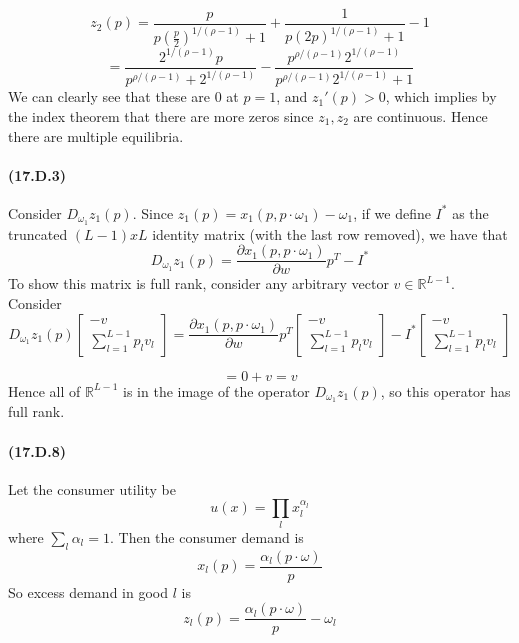 \documentclass[10pt,letter]{article}
\begin{document}
\[ z_2(p) = \frac{p}{p\left(\frac{p}{2} \right)^{1/(\rho-1)} + 1} + \frac{1}{ p(2p)^{1/(\rho-1)} + 1} - 1\]
\[= \frac{2^{1/(\rho-1)} p}{p^{\rho/(\rho-1)} + 2^{1/(\rho-1)} } - \frac{p^{\rho/(\rho-1)}2^{1/(\rho-1)}}{ p^{\rho/(\rho-1)}2^{1/(\rho-1)} + 1}\]
We can clearly see that these are 0 at $p=1$, and $z_1'(p) > 0 $, which implies by the index theorem that there are more zeros since $z_1, z_2$ are continuous. Hence there are multiple equilibria.
\paragraph{(17.D.3)}

Consider $D_{\omega_1}z_1(p)$. Since $z_1(p) = x_1(p, p\cdot\omega_1) - \omega_1$, if we define $I^*$ as the truncated $(L-1) x L$ identity matrix (with the last row removed), we have that
\[ D_{\omega_1} z_1(p) = \frac{\partial x_1(p, p\cdot\omega_1) }{\partial w} p^T - I^* \]
To show this matrix is full rank, consider any arbitrary vector $v \in \mathbb{R}^{L-1}$. Consider
\[ D_{\omega_1}z_1(p) \begin{bmatrix} -v \\ \sum_{l=1}^{L-1} p_l v_l \end{bmatrix} = \frac{\partial x_1(p, p\cdot\omega_1) }{\partial w} p^T \begin{bmatrix} -v \\ \sum_{l=1}^{L-1} p_l v_l \end{bmatrix} - I^* \begin{bmatrix} -v \\ \sum_{l=1}^{L-1} p_l v_l \end{bmatrix} \]

\[ = 0 + v = v \]
Hence all of $\mathbb{R}^{L-1}$ is in the image of the operator $D_{\omega_1}z_1(p)$, so this operator has full rank.

\paragraph{(17.D.8)}

Let the consumer utility be
\[ u(x) = \prod_l x_l^{\alpha_l} \]
where $\sum_l \alpha_l = 1$. Then the consumer demand is
\[ x_l(p) = \frac{\alpha_l (p \cdot \omega)}{p} \]
So excess demand in good $l$ is
\[ z_l(p) = \frac{\alpha_l (p \cdot \omega)}{p} - \omega_l \]
\end{document}
